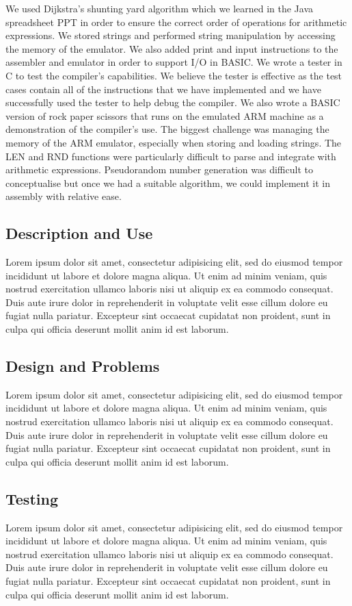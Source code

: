 \documentclass[11pt, letterpaper]{article}
\begin{document}
We used Dijkstra's shunting yard algorithm which we learned in the Java spreadsheet PPT in order to ensure the correct order of operations for arithmetic expressions. We stored strings and performed string manipulation by accessing the memory of the emulator. We also added print and input instructions to the assembler and emulator in order to support I/O in BASIC. We wrote a tester in C to test the compiler's capabilities. We believe the tester is effective as the test cases contain all of the instructions that we have implemented and we have successfully used the tester to help debug the compiler. We also wrote a BASIC version of rock paper scissors that runs on the emulated ARM machine as a demonstration of the compiler's use.
The biggest challenge was managing the memory of the ARM emulator, especially when storing and loading strings. The LEN and RND functions were particularly difficult to parse and integrate with arithmetic expressions. Pseudorandom number generation was difficult to conceptualise but once we had a suitable algorithm, we could implement it in assembly with relative ease.

\subsection{Description and Use}
Lorem ipsum dolor sit amet, consectetur adipisicing elit, sed do eiusmod tempor
incididunt ut labore et dolore magna aliqua. Ut enim ad minim veniam, quis
nostrud exercitation ullamco laboris nisi ut aliquip ex ea commodo consequat.
Duis aute irure dolor in reprehenderit in voluptate velit esse cillum dolore eu
fugiat nulla pariatur. Excepteur sint occaecat cupidatat non proident, sunt in
culpa qui officia deserunt mollit anim id est laborum.

\subsection{Design and Problems}
Lorem ipsum dolor sit amet, consectetur adipisicing elit, sed do eiusmod tempor
incididunt ut labore et dolore magna aliqua. Ut enim ad minim veniam, quis
nostrud exercitation ullamco laboris nisi ut aliquip ex ea commodo consequat.
Duis aute irure dolor in reprehenderit in voluptate velit esse cillum dolore eu
fugiat nulla pariatur. Excepteur sint occaecat cupidatat non proident, sunt in
culpa qui officia deserunt mollit anim id est laborum.

\subsection{Testing}
Lorem ipsum dolor sit amet, consectetur adipisicing elit, sed do eiusmod tempor
incididunt ut labore et dolore magna aliqua. Ut enim ad minim veniam, quis
nostrud exercitation ullamco laboris nisi ut aliquip ex ea commodo consequat.
Duis aute irure dolor in reprehenderit in voluptate velit esse cillum dolore eu
fugiat nulla pariatur. Excepteur sint occaecat cupidatat non proident, sunt in
culpa qui officia deserunt mollit anim id est laborum.
\end{document}
